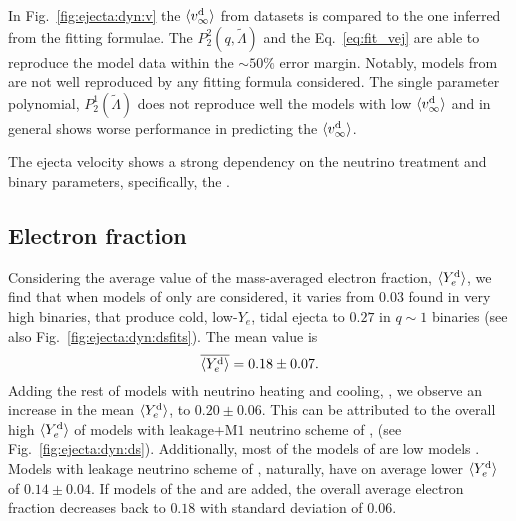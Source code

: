 In Fig.~\ref{fig:ejecta:dyn:v} the $\langle v^{\text{d}}_\infty\rangle$ from datasets is compared to the one 
inferred from the fitting formulae. The $P_2^2(q,\tilde\Lambda)$ and the 
Eq.~\eqref{eq:fit_vej} are able to reproduce the model data within the ${\sim}50\%$ 
error margin. Notably, models from \DSnone{} are not well reproduced by any fitting 
formula considered. The single parameter polynomial, $P_2^1(\tilde\Lambda)$ does not 
reproduce well the models with low $\langle v^{\text{d}}_\infty\rangle$ and in general shows worse performance in 
predicting the $\langle v^{\text{d}}_\infty\rangle$.

%
The ejecta velocity shows a strong dependency on the neutrino treatment and binary parameters, 
specifically, the \mr{}.


\subsection{Electron fraction} 

Considering the average value of the mass-averaged electron fraction, $\langle Y^{\text{d}}_{e}\rangle$, we find 
that when models of \DSrefset{} only are considered, it varies from $0.03$ found in very high \mr{} binaries,
that produce cold, low-$Y_e$, tidal ejecta \citep{Bernuzzi:2020tgt} to $0.27$ in $q\sim1$ 
binaries (see also Fig.~\ref{fig:ejecta:dyn:dsfits}). 
%
The mean value is 
%
\begin{equation}
\label{eq:ejecta:dyn:avg:y}
\overline{\langle Y^{\text{d}}_{e}\rangle} = 0.18 \pm 0.07.
\end{equation}
%
Adding the rest of models with neutrino heating and cooling, \DSheatcool{},  we observe
an increase in the mean $\langle Y^{\text{d}}_{e}\rangle$, to $0.20 \pm 0.06$. This can be attributed to the overall 
high $\langle Y^{\text{d}}_{e}\rangle$ of models with leakage+M$1$ neutrino scheme of 
\citet{Sekiguchi:2015dma,Sekiguchi:2016bjd}, (see Fig.~\ref{fig:ejecta:dyn:ds}).
Additionally, most of the models of \DSheatcool{} are low \mr{} models 
\citep[\eg][]{Vincent:2019kor}.
%
Models with leakage neutrino scheme of \DScool{}, naturally, have on average lower 
$\langle Y^{\text{d}}_{e}\rangle$ of $0.14 \pm 0.04$. If models of the \DSheatcool{} and \DSrefset{} are added, the overall average 
electron fraction decreases back to $0.18$ with standard deviation of $0.06$.

